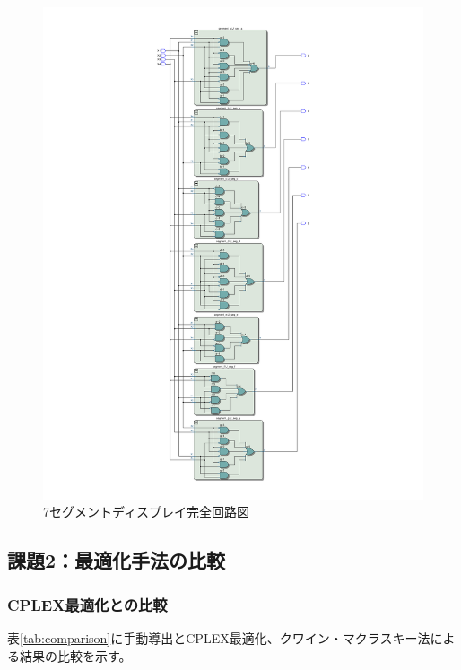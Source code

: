 \documentclass[a4j,dvipdfmx]{jsarticle}
\begin{document}
\begin{figure}[H]
\centering
\includegraphics[width=1.1\textwidth]{resources/circuit/seven_segment_circuit_open.pdf}
\caption{7セグメントディスプレイ完全回路図}
\label{fig:complete_circuit}
\end{figure}

\subsection{課題2：最適化手法の比較}

\subsubsection{CPLEX最適化との比較}

表\ref{tab:comparison}に手動導出とCPLEX最適化、クワイン・マクラスキー法による結果の比較を示す。
\end{document}
